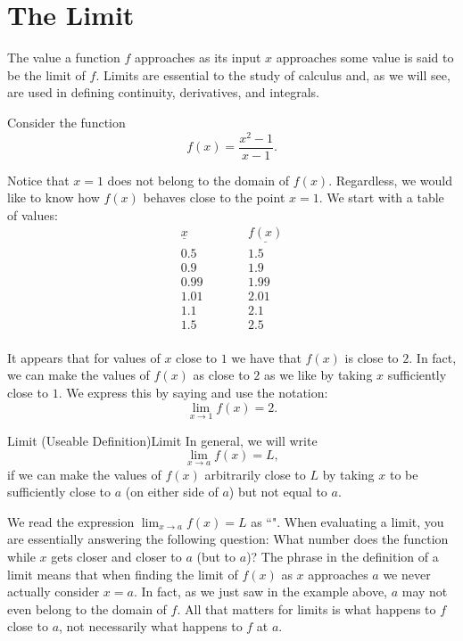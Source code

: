 

\section{The Limit}\label{sec:LimitsWorkingDefn}
The value a function $f$ approaches as its input $x$ approaches some value is said to be the limit of $f$. Limits are essential to the study of calculus and, as we will see, are used in defining continuity, derivatives, and integrals.

Consider the function
$$f(x)=\frac{x^2-1}{x-1}.$$

Notice that $x=1$ does not belong to the domain of $f(x)$.
Regardless, we would like to know how $f(x)$ behaves close to the point $x=1$.
We start with a table of values:
$$\begin{array}{ccc}
\underline{x}&\qquad&\underline{f(x)}\\
0.5&\qquad&1.5\\
0.9&\qquad&1.9\\
0.99&\qquad&1.99\\
1.01&\qquad&2.01\\
1.1&\qquad&2.1\\
1.5&\qquad&2.5\\
\end{array}$$

It appears that for values of $x$ close to $1$ we have that $f(x)$ is close to $2$.
In fact, we can make the values of $f(x)$ as close to $2$ as we like by taking $x$ sufficiently close to $1$.
We express this by saying  and use the notation:
$$\lim_{x\to 1}f(x)=2.$$
\begin{definition}{Limit (Useable Definition)}{Limit}
In general, we will write
$$\lim_{x\to a}f(x)=L,$$
if we can make the values of $f(x)$ arbitrarily close to $L$ by taking $x$ to be sufficiently close to $a$ (on either side of $a$) but not equal to $a$.
\end{definition}

We read the expression $\lim_{x\to a}f(x)=L$ as ``".
When evaluating a limit, you are essentially answering the following question: 
What number does the function  while $x$ gets closer and closer to $a$ (but  to $a$)?
The phrase  in the definition of a limit means 
that when finding the limit of $f(x)$ as $x$ approaches $a$ we never actually consider $x=a$.
In fact, as we just saw in the example above, $a$ may not even belong to the domain of $f$.
All that matters for limits is what happens to $f$ close to $a$, not necessarily what happens to $f$ at $a$.







